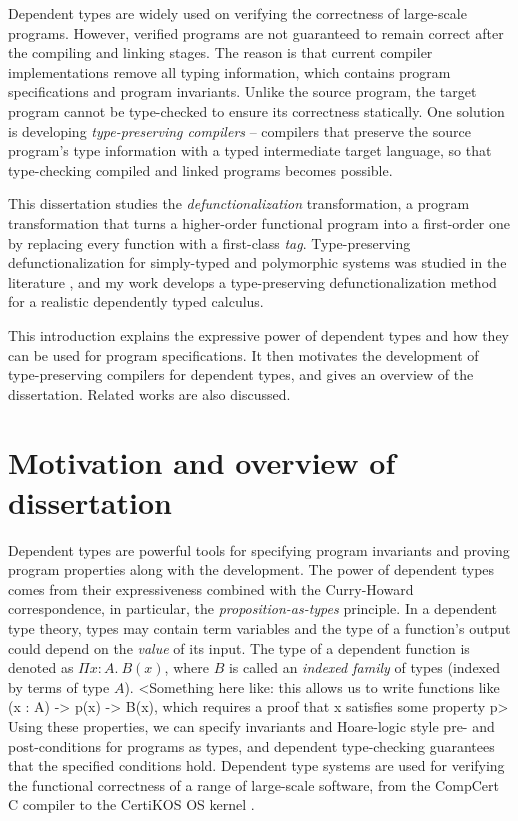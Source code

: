 
Dependent types are widely used on verifying the correctness of large-scale programs. However, verified programs are not guaranteed to remain correct after the compiling and linking stages. The reason is that current compiler implementations remove all typing information, which contains program specifications and program invariants. Unlike the source program, the target program cannot be type-checked to ensure its correctness statically. One solution is developing \textit{type-preserving compilers} – compilers that preserve the source program's type information with a typed intermediate target language, so that type-checking compiled and linked programs becomes possible.

This dissertation studies the \textit{defunctionalization} transformation, a program transformation that turns a higher-order functional program into a first-order one by replacing every function with a first-class \textit{tag}. Type-preserving defunctionalization for simply-typed and polymorphic systems was studied in the literature \cite{reynolds1972definitional,pottier2004polymorphic}, and my work develops a type-preserving defunctionalization method for a realistic dependently typed calculus.

This introduction explains the expressive power of dependent types and how they can be used for program specifications. It then motivates the development of type-preserving compilers for dependent types, and gives an overview of the dissertation. Related works are also discussed.

\section{Motivation and overview of dissertation}

Dependent types are powerful tools for specifying program invariants and proving program properties along with the development. The power of dependent types comes from their expressiveness combined with the Curry-Howard correspondence, in particular, the \textit{proposition-as-types} principle. In a dependent type theory, types may contain term variables and the type of a function’s output could depend on the \textit{value} of its input. The type of a dependent function is denoted as $\Pi x:A.\ B(x)$, where $B$ is called an \textit{indexed family} of types (indexed by terms of type $A$). <Something here like: this allows us to write functions like (x : A) -> p(x) -> B(x), which requires a proof that x satisfies some property p> Using these properties, we can specify invariants and Hoare-logic style pre- and post-conditions for programs as types, and dependent type-checking guarantees that the specified conditions hold. Dependent type systems are used for verifying the functional correctness of a range of large-scale software, from the CompCert C compiler \cite{leroy2006formal} to the CertiKOS OS kernel \cite{gu2015deep}.

